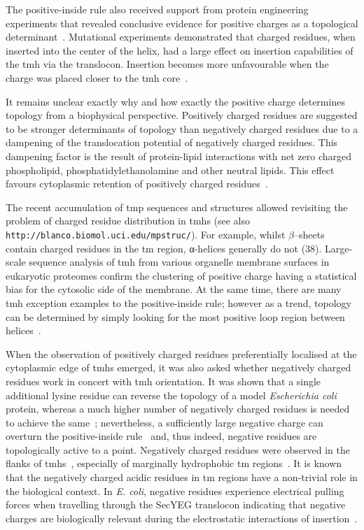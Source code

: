 The positive-inside rule also received support from protein engineering experiments that revealed conclusive evidence for positive charges as a topological determinant~\cite{VonHeijne1989, Beltzer1991, Kida2006, Nilsson1990}. Mutational experiments demonstrated that charged residues, when inserted into the center of the helix, had a large effect on insertion capabilities of the \gls{tmh} via the translocon. Insertion becomes more unfavourable when the charge was placed closer to the \gls{tmh} core~\cite{Hessa2005}.

It remains unclear exactly why and how exactly the positive charge determines topology from a biophysical perspective. Positively charged residues are suggested to be stronger determinants of topology than negatively charged residues due to a dampening of the translocation potential of negatively charged residues. This dampening factor is the result of protein-lipid interactions with net zero charged phospholipid, phosphatidylethanolamine and other neutral lipids. This effect favours cytoplasmic retention of positively charged residues~\cite{Bogdanov2014}.

The recent accumulation of \gls{tmp} sequences and structures allowed revisiting the problem of charged residue distribution in \gls{tmh}s (see also \texttt{http://blanco.biomol.uci.edu/mpstruc/}). For example, whilst \(\beta\)--sheets contain charged residues in the \gls{tm} region, α-helices generally do not (38). Large-scale sequence analysis of \gls{tmh} from various organelle membrane surfaces in eukaryotic proteomes confirm the clustering of positive charge having a statistical bias for the cytosolic side of the membrane. At the same time, there are many \gls{tmh} exception examples to the positive-inside rule; however as a trend, topology can be determined by simply looking for the most positive loop region between helices~\cite{Sharpe2010, Baeza-Delgado2013}.

When the observation of positively charged residues preferentially localised at the cytoplasmic edge of \gls{tmh}s emerged, it was also asked whether negatively charged residues work in concert with \gls{tmh} orientation. It was shown that a single additional lysine residue can reverse the topology of a model \textit{Escherichia coli} protein, whereas a much higher number of negatively charged residues is needed to achieve the same~\cite{Nilsson1990}; nevertheless, a sufficiently large negative charge can overturn the positive-inside rule~\cite{Andersson1993, Kim1994} and, thus indeed, negative residues are topologically active to a point. Negatively charged residues were observed in the flanks of \gls{tmh}s~\cite{Baeza-Delgado2013}, especially of marginally hydrophobic \gls{tm} regions~\cite{Delgado-Partin1998}. It is known that the negatively charged acidic residues in \gls{tm} regions have a non-trivial role in the biological context. In \textit{E. coli}, negative residues experience electrical pulling forces when travelling through the SecYEG translocon indicating that negative charges are biologically relevant during the electrostatic interactions of insertion~\cite{Ismail2012, Ismail2015}.

